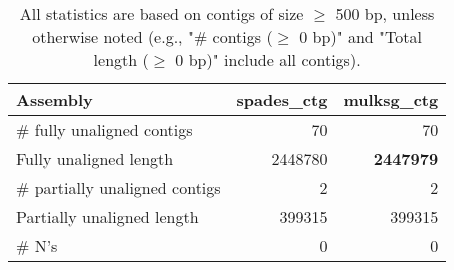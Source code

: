 \documentclass[12pt,a4paper]{article}
\begin{document}
\begin{table}[ht]
\begin{center}
\caption{All statistics are based on contigs of size $\geq$ 500 bp, unless otherwise noted (e.g., "\# contigs ($\geq$ 0 bp)" and "Total length ($\geq$ 0 bp)" include all contigs).}
\begin{tabular}{|l*{2}{|r}|}
\hline
Assembly & spades\_ctg & mulksg\_ctg \\ \hline
\# fully unaligned contigs & 70 & 70 \\ \hline
Fully unaligned length & 2448780 & {\bf 2447979} \\ \hline
\# partially unaligned contigs & 2 & 2 \\ \hline
Partially unaligned length & 399315 & 399315 \\ \hline
\# N's & 0 & 0 \\ \hline
\end{tabular}
\end{center}
\end{table}
\end{document}
